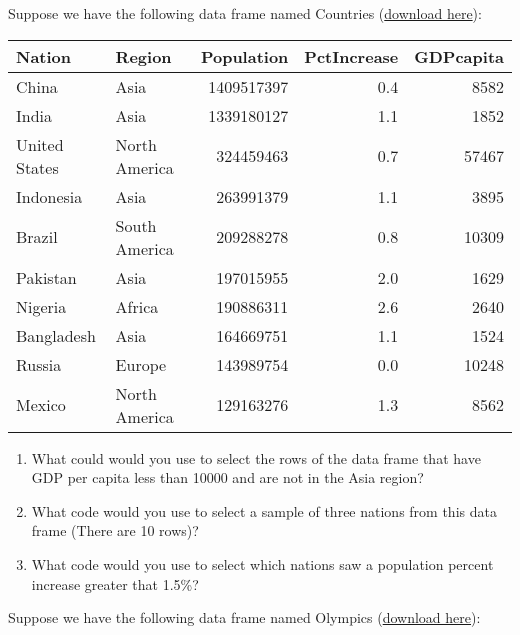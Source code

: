 \documentclass[
]{book}
\providecommand{\tightlist}{%
  \setlength{\itemsep}{0pt}\setlength{\parskip}{0pt}}
\begin{document}
Suppose we have the following data frame named Countries (\href{data/countries.xlsx}{download here}):

\begin{tabular}{l|l|r|r|r}
\hline
Nation & Region & Population & PctIncrease & GDPcapita\\
\hline
China & Asia & 1409517397 & 0.4 & 8582\\
\hline
India & Asia & 1339180127 & 1.1 & 1852\\
\hline
United States & North America & 324459463 & 0.7 & 57467\\
\hline
Indonesia & Asia & 263991379 & 1.1 & 3895\\
\hline
Brazil & South America & 209288278 & 0.8 & 10309\\
\hline
Pakistan & Asia & 197015955 & 2.0 & 1629\\
\hline
Nigeria & Africa & 190886311 & 2.6 & 2640\\
\hline
Bangladesh & Asia & 164669751 & 1.1 & 1524\\
\hline
Russia & Europe & 143989754 & 0.0 & 10248\\
\hline
Mexico & North America & 129163276 & 1.3 & 8562\\
\hline
\end{tabular}

\begin{enumerate}
\def\labelenumi{\arabic{enumi}.}
\setcounter{enumi}{4}
\tightlist
\item
  What could would you use to select the rows of the data frame that have GDP per capita less than 10000 and are not in the Asia region?
\item
  What code would you use to select a sample of three nations from this data frame (There are 10 rows)?
\item
  What code would you use to select which nations saw a population percent increase greater that 1.5\%?
\end{enumerate}

Suppose we have the following data frame named Olympics (\href{data/olympics.xlsx}{download here}):
\end{document}
